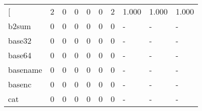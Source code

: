 \begin{longtable}{lp{1.3cm}p{1.3cm}p{1.3cm}p{1.3cm}p{1.3cm}p{1.3cm}p{1.3cm}p{1.3cm}p{1.3cm}}
\bottomrule
\endlastfoot
{[}         &                      2 &                                  0 &                                 0 &                                0 &                                 0 &                               2 &                                1.000 &                                  1.000 &                                1.000 \\
b2sum     &                      0 &                                  0 &                                 0 &                                0 &                                 0 &                               0 &                                    - &                                      - &                                    - \\
base32    &                      0 &                                  0 &                                 0 &                                0 &                                 0 &                               0 &                                    - &                                      - &                                    - \\
base64    &                      0 &                                  0 &                                 0 &                                0 &                                 0 &                               0 &                                    - &                                      - &                                    - \\
basename  &                      0 &                                  0 &                                 0 &                                0 &                                 0 &                               0 &                                    - &                                      - &                                    - \\
basenc    &                      0 &                                  0 &                                 0 &                                0 &                                 0 &                               0 &                                    - &                                      - &                                    - \\
cat       &                      0 &                                  0 &                                 0 &                                0 &                                 0 &                               0 &                                    - &                                      - &                                    - \\

\end{longtable}

